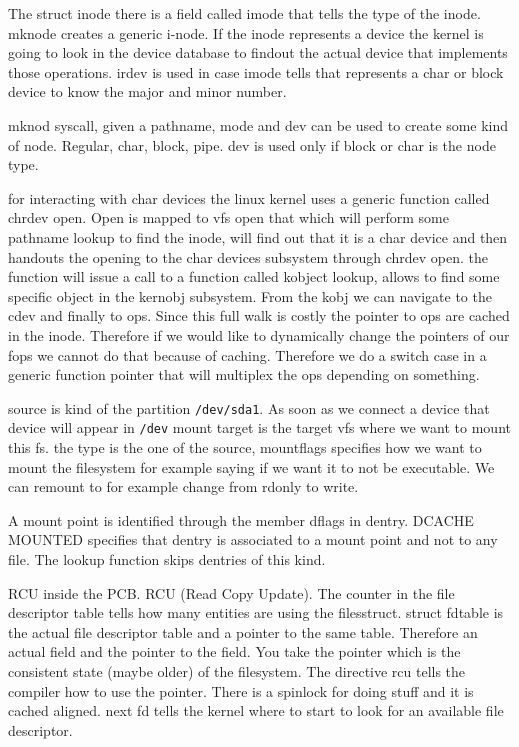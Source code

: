 \documentclass[twoside]{article}
\begin{document}
The struct inode there is a field called imode that tells the type of the inode.
mknode creates a generic i-node. If the inode represents a device the kernel is
going to look in the device database to findout the actual device that
implements those operations. irdev is used in case imode tells that represents a
char or block device to know the major and minor number.

mknod syscall, given a pathname, mode and dev can be used to create some kind of
node.
Regular, char, block, pipe. dev is used only if block or char is the node type.

for interacting with char devices the linux kernel uses a generic function
called chrdev open. Open is mapped to vfs open that which will perform some
pathname lookup to find the inode, will find out that it is a char device and
then handouts the opening to the char devices subsystem through chrdev open.
the function will issue a call to a function called kobject lookup, allows to
find some specific object in the kernobj subsystem. From the kobj we can
navigate to the cdev and finally to ops. Since this full walk is costly the
pointer to ops are cached in the inode. Therefore if we would like to
dynamically change the pointers of our fops we cannot do that because of
caching. Therefore we do a switch case in a generic function pointer that will
multiplex the ops depending on something.

source is kind of the partition \texttt{/dev/sda1}. As soon as we connect a
device that device will appear in \texttt{/dev}
mount target is the target vfs where we want to mount this fs. the type is the
one of the source, mountflags specifies how we want to mount the filesystem for
example saying if we want it to not be executable. We can remount to for example
change from rdonly to write.

A mount point is identified through the member dflags in dentry. DCACHE MOUNTED
specifies that dentry is associated to a mount point and not to any file.
The lookup function skips dentries of this kind.

RCU inside the PCB.
RCU (Read Copy Update). The counter in the file descriptor table tells how many
entities are using the filesstruct. struct fdtable is the actual file descriptor
table and a pointer to the same table. Therefore an actual field and the pointer
to the field. You take the pointer which is the consistent state (maybe older)
of the filesystem. The directive rcu tells the compiler how to use the pointer.
There is a spinlock for doing stuff and it is cached aligned. next fd tells
the kernel where to start to look for an available file descriptor.
\end{document}
